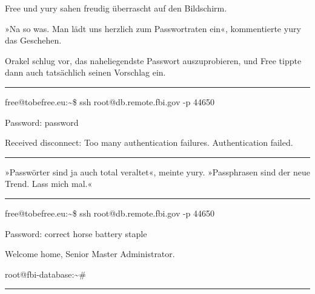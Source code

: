 Free und yury sahen freudig überrascht auf den Bildschirm.

»Na so was. Man lädt uns herzlich zum Passwortraten ein«, kommentierte yury das Geschehen.

Orakel schlug vor, das naheliegendste Passwort auszuprobieren, und Free tippte dann auch tatsächlich seinen Vorschlag ein.

\noindent \parbox{\textwidth}{ \vspace{3ex} \hrule \vspace{3ex}

    \begin{footnotesize}
    \begin{ttfamily}

\noindent free@tobefree.eu:\textasciitilde{}\$ ssh root@db.remote.fbi.gov -p 44650

\noindent Password: password

\noindent Received disconnect: Too many authentication failures. Authentication failed.

    \end{ttfamily}
    \end{footnotesize}

\vspace{3ex} \hrule \vspace{3ex} }

»Passwörter sind ja auch total veraltet«, meinte yury. »Passphrasen sind der neue Trend. Lass mich mal.«

\noindent \parbox{\textwidth}{ \vspace{3ex} \hrule \vspace{3ex}

    \begin{footnotesize}
    \begin{ttfamily}

\noindent free@tobefree.eu:\textasciitilde{}\$ ssh root@db.remote.fbi.gov -p 44650

\noindent Password: correct horse battery staple

\noindent Welcome home, Senior Master Administrator.

\noindent root@fbi-database:\textasciitilde{}\#

    \end{ttfamily}
    \end{footnotesize}

\vspace{3ex} \hrule \vspace{3ex} }

